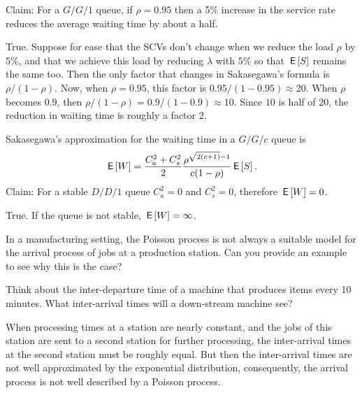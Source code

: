\documentclass[stochastic-or.tex]{subfiles}
\begin{document}
\begin{truefalse}
Claim: For a $G/G/1$ queue, if $\rho=0.95$ then a 5\% increase in the service rate reduces the average waiting time by about a half.
\begin{solution}
        True. Suppose for ease that the SCVs don't change when we reduce the load $\rho$ by $5\%$, and that we achieve this load by reducing $\lambda$ with $5\%$ so that $\,\mathsf{E}\left[S\right]$ remains the same too. Then the only factor that changes in Sakasegawa's formula is $\rho/(1-\rho)$. Now, when $\rho=0.95$, this factor is $0.95/(1-0.95) \approx 20$. When $\rho$ becomes $0.9$, then $\rho/(1-\rho) = 0.9/(1-0.9) \approx 10$. Since $10$ is half of $20$, the reduction in waiting time is roughly a factor 2.
\end{solution}
\end{truefalse}

\begin{truefalse}
Sakasegawa's approximation for the waiting time in a $G/G/c$ queue is
\begin{equation*}
 \,\mathsf{E}\left[W\right] = \frac{C_a^2+C_s^2}2 \frac{\rho^{\sqrt{2(c+1)}-1}}{c(1-\rho)} \,\mathsf{E}\left[S\right].
\end{equation*}
Claim: For a stable $D/D/1$ queue $C_a^2=0$ and $C_s^2=0$, therefore $\,\mathsf{E}\left[W\right]=0$.
\begin{solution}
True. If the queue is not stable, $\,\mathsf{E}\left[W\right] = \infty$.
\end{solution}
\end{truefalse}

\begin{exercise}
In a manufacturing setting, the Poisson process is not always a suitable model for the arrival process of jobs at a production station. Can you provide an example to see why this is the case?
\begin{hint}
Think about the inter-departure time of a machine that produces items every 10 minutes. What inter-arrival times will a down-stream machine see?

\end{hint}
\begin{solution}
  When processing times at a station are nearly constant, and the jobs of this station are sent to a second station for further processing, the inter-arrival times at the second station must be roughly equal.
  But then the inter-arrival times are not well approximated by the exponential distribution, consequently, the arrival process is not well described by a Poisson process.
\end{solution}
\end{exercise}
\end{document}
